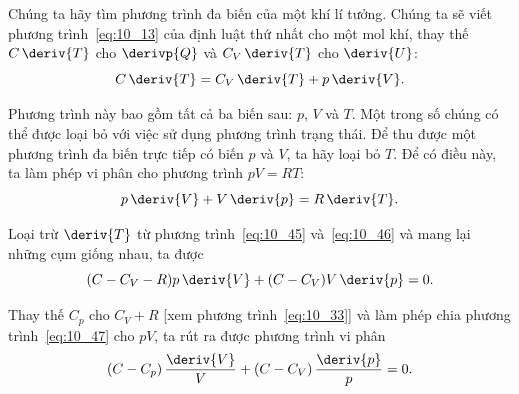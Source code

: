 
Chúng ta hãy tìm phương trình đa biến của một khí lí tưởng. Chúng ta sẽ viết phương trình~\eqref{eq:10_13} của định luật thứ nhất cho một mol khí, thay thế $C\,\deriv{T}$ cho $\derivp{Q}$ và $C_V\,\deriv{T}$ cho $\deriv{U}$: 
\begin{equation}\label{eq:10_45}
	C\,\deriv{T} = C_V\,\deriv{T} + p\,\deriv{V}.
\end{equation}

\noindent

Phương trình này bao gồm tất cả ba biến sau: $p$, $V$ và $T$. Một trong số chúng có thể được loại bỏ với việc sử dụng phương trình trạng thái. Để thu được một phương trình đa biến trực tiếp có biến $p$ và $V$, ta hãy loại bỏ $T$. Để có điều này, ta làm phép vi phân cho phương trình $pV=RT$:
\begin{equation}\label{eq:10_46}
	p\,\deriv{V} + V\,\deriv{p} = R\,\deriv{T}.
\end{equation}

\noindent

Loại trừ $\deriv{T}$ từ phương trình~\eqref{eq:10_45} và~\eqref{eq:10_46} và mang lại những cụm giống nhau, ta được
\begin{equation}\label{eq:10_47}
	(C - C_V - R) p\,\deriv{V} + (C - C_V) V\,\deriv{p} = 0.
\end{equation}

\noindent

Thay thế $C_p$ cho $C_V+R$ [xem phương trình~\eqref{eq:10_33}] và làm phép chia phương trình~\eqref{eq:10_47} cho $pV$, ta rút ra được phương trình vi phân 
\begin{equation}\label{eq:10_48}
	(C - C_p)\,\frac{\deriv{V}}{V} + (C - C_V) \,\frac{\deriv{p}}{p} = 0.
\end{equation}

